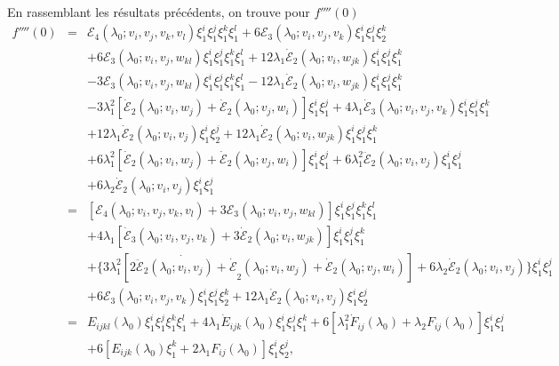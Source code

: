 \documentclass{article}
\newcommand{\mathlambda}{\lambda}
\newcommand{\nocomma}{}
\newcommand{\nosymbol}{}
\begin{document}
En rassemblant les r{\'e}sultats pr{\'e}c{\'e}dents, on trouve pour $f''''
(0)$
\begin{eqnarray*}
  f'''' (0) & = & \mathcal{E}_4 (\lambda_0 ; v_i, v_j, v_k {, v_l} ) \xi_1^i
  \xi_1^j \xi_1^k \xi_1^l + 6\mathcal{E}_3 (\lambda_0 ; v_i, v_j, v_k) \xi_1^i
  \xi_1^j \xi_2^k\\
  &  & \nosymbol + 6\mathcal{E}_3 (\lambda_0 ; v_i, v_j, w_{k \nocomma l})
  \xi_1^i \xi_1^j \xi_1^k \xi_1^l + 12 \lambda_1  \dot{\mathcal{E}}_2
  (\lambda_0 ; v_{i \nocomma}, w_{j \nocomma k}) \xi_1^i \xi_1^j \xi_1^k\\
  &  & \nosymbol - 3\mathcal{E}_3 (\lambda_0 ; v_i, v_j, w_{k \nocomma l})
  \xi_1^i \xi_1^j \xi_1^k \xi_1^l - 12 \lambda_1  \dot{\mathcal{E}}_2
  (\lambda_0 ; v_i, w_{j \nocomma k}) \xi_1^i \xi_1^j \xi_1^k\\
  &  & \nosymbol - 3 \lambda_1^2  [\dot{\mathcal{E}}_2 (\lambda_0 ; v_i, w_j)
  + \dot{\mathcal{E}}_2 (\lambda_0 ; v_j, w_i)] \xi_1^i \xi_1^j + 4 \lambda_1
  \dot{\mathcal{E}}_3 (\lambda_0 ; v_i, v_j, v_k) \xi_1^i \xi_1^j \xi_1^k\\
  &  & \nosymbol + 12 \mathlambda_1  \dot{\mathcal{E}}_2 (\lambda_0 ; v_i,
  v_j) \xi_1^i \xi_2^j + 12 \mathlambda_1  \dot{\mathcal{E}}_2 (\lambda_0 ;
  v_i, w_{j \nocomma k}) \xi_1^i \xi_1^j \xi_1^k\\
  &  & \nosymbol + 6 \mathlambda_1^2  [\dot{\mathcal{E}}_2 (\lambda_0 ; v_i,
  w_j) + \dot{\mathcal{E}}_2 (\lambda_0 ; v_j, w_i)] \xi_1^i \xi_1^j + 6
  \lambda_1^2  \ddot{\mathcal{E}}_2 (\lambda_0 ; v_i, v_j) \xi_1^i \xi_1^j\\
  &  & \nosymbol + 6 \lambda_2  \dot{\mathcal{E}}_2 (\lambda_0 ; v_i, v_j)
  \xi_1^i \xi_1^j\\
  & = & \left[ \mathcal{E}_4 (\lambda_0 ; v_i, v_j, v_k {, v_l} ) +
  3\mathcal{E}_3 (\lambda_0 ; v_i, v_j, w_{k \nocomma l}) \right] \xi_1^i
  \xi_1^j \xi_1^k \xi_1^l\\
  &  & \nosymbol + 4 \lambda_1  [\dot{\mathcal{E}}_3 (\lambda_0 ; v_i, v_j,
  v_k) + 3 \dot{\mathcal{E}}_2 (\lambda_0 ; v_i, w_{j \nocomma k})] \xi_1^i
  \xi_1^j \xi_1^k\\
  &  & \nosymbol + \{ 3 \mathlambda_1^2  [\dot{2 \ddot{\mathcal{E}}_2
  (\lambda_0 ; v_i, v_j) + \dot{\mathcal{E}}}_2 (\lambda_0 ; v_i, w_j) +
  \dot{\mathcal{E}}_2 (\lambda_0 ; v_j, w_i)] + 6 \lambda_2
  \dot{\mathcal{E}}_2 (\lambda_0 ; v_i, v_j) \} \xi_1^i \xi_1^j\\
  &  & \nosymbol + 6\mathcal{E}_3 (\lambda_0 ; v_i, v_j, v_k) \xi_1^i \xi_1^j
  \xi_2^k + 12 \mathlambda_1  \dot{\mathcal{E}}_2 (\lambda_0 ; v_i, v_j)
  \xi_1^i \xi_2^j\\
  & = & E_{i \nocomma j \nocomma k \nocomma l} (\lambda_0) \xi_1^i \xi_1^j
  \xi_1^k \xi_1^l + 4 \mathlambda_1  \dot{E}_{i \nocomma j \nocomma k}
  (\lambda_0) \xi_1^i \xi_1^j \xi_1^k + 6 [\mathlambda_1^2  \dot{F}_{i
  \nocomma j} (\mathlambda_0) + \lambda_2 F_{i \nocomma j} (\lambda_0)]
  \xi_1^i \xi_1^j\\
  &  & \nosymbol + 6 [E_{i \nocomma j \nocomma k} (\lambda_0) \xi_1^k + 2
  \mathlambda_1 F_{i \nocomma j} (\lambda_0)] \xi_1^i \xi_2^j,
\end{eqnarray*}
\end{document}
